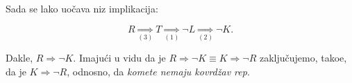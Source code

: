 \documentclass[11pt]{article}
\begin{document}
	\noindent
	Sada se lako uo\v cava niz implikacija:

	\begin{equation*}
		R \underset{(3)}{\Rightarrow} T \underset{(1)}{\Rightarrow} \neg L \underset{(2)}{\Rightarrow} \neg K.
	\end{equation*}

	\noindent
	Dakle, $ R \Rightarrow \neg K $. Imaju\' ci u vidu da je $ R \Rightarrow \neg K \equiv K \Rightarrow \neg R $ zaklju\v cujemo, tako\dj e, da je $ K \Rightarrow \neg R $, odnosno, da \emph{komete nemaju kovrd\v zav rep}.
\end{document}
